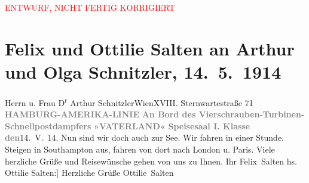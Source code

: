 
\begin{center}
            \textcolor{red}{ENTWURF, NICHT FERTIG KORRIGIERT}
                      \end{center}
            
         
         \renewcommand{\erwaehntePersonen}{Personen: Olga Schnitzler}
         \renewcommand{\erwaehnteInstitutionen}{Institutionen: Hamburg-Amerika-Linie, Schnellpostdampfer Vaterland}
         \renewcommand{\erwaehnteOrte}{Orte: Cuxhaven, London, Paris, Southampton, Sternwartestraße, Wien}
         \renewcommand{\erwaehnteWerke}{}
               \section[Felix und Ottilie Salten an Arthur und Olga Schnitzler, 14. 5. 1914]{ Felix und Ottilie Salten an Arthur und Olga Schnitzler,
               14. 5. 1914}\nopagebreak{}\rehead{ }\begin{ledgroupsized}[t]{13cm}\normalsize\beginnumbering \toendnotes[C]{\smallbreak\pagebreak[2]} 
\pstart{}{\pb}Herrn u. Frau D\textsuperscript{r} Arthur Schnitzler\pend{}\pstart{}Wien\pend{}\pstart{}XVIII. Sternwartestraße 71\pend{}{\bigskip}\pstart
           \noindent{}{\pb}\textcolor{gray}{\textbf{HAMBURG-AMERIKA-LINIE}}\pend
           \pstart
           \textcolor{gray}{\textbf{An Bord des Vierschrauben-Turbinen-Schnellpostdampfers}}\pend
           \pstart
           \textcolor{gray}{\textbf{»VATERLAND«}}\pend
           \pstart
           \textcolor{gray}{\textbf{Speisesaal I. Klasse}}\pend
           \pstart
           {\pb}\textcolor{gray}{\textbf{den}}14. V. 14.\pend
           \pstart
           Nun sind wir doch auch zur See. Wir fahren in einer Stunde. Steigen in Southampton aus, fahren von dort nach London u. Paris. Viele herzliche Grüße
               und Reisewünsche gehen von uns zu Ihnen. Ihr \pend
           \pstart \spacefill\mbox{Felix Salten}\pend{}\pstart
           \noindent{}{[}hs. Ottilie Salten:{]} Herzliche Grüße\pend
           \pstart \spacefill\mbox{Ottilie Salten}\pend{}
         

\end{ledgroupsized}
